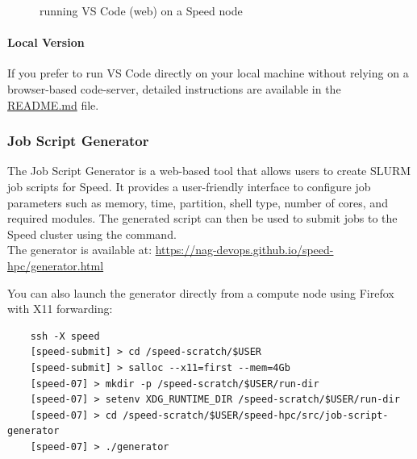 \begin{figure}[htbp]
	\centering
	\caption{running VS Code (web) on a Speed node}
	\label{fig:vscode}
\end{figure}

\paragraph{Local Version}
\label{sect:local-vscode}
If you prefer to run VS Code directly on your local machine without relying on a browser-based code-server, 
detailed instructions are available in the  \href{https://github.com/NAG-DevOps/speed-hpc/blob/master/src/vscode}{README.md} file.

\subsubsection{Job Script Generator}
\label{sect:job-script-generator}
The Job Script Generator is a web-based tool that allows users to create SLURM job scripts for Speed.
It provides a user-friendly interface to configure job parameters such as memory, time, partition, shell type, number of cores, and required modules.
The generated script can then be used to submit jobs to the Speed cluster using the  command.\\

The generator is available at: \url{https://nag-devops.github.io/speed-hpc/generator.html}

\noindent You can also launch the generator directly from a compute node using Firefox with X11 forwarding:
\scriptsize
\begin{verbatim}
    ssh -X speed
    [speed-submit] > cd /speed-scratch/$USER
    [speed-submit] > salloc --x11=first --mem=4Gb
    [speed-07] > mkdir -p /speed-scratch/$USER/run-dir
    [speed-07] > setenv XDG_RUNTIME_DIR /speed-scratch/$USER/run-dir
    [speed-07] > cd /speed-scratch/$USER/speed-hpc/src/job-script-generator
    [speed-07] > ./generator
\end{verbatim}
\normalsize

